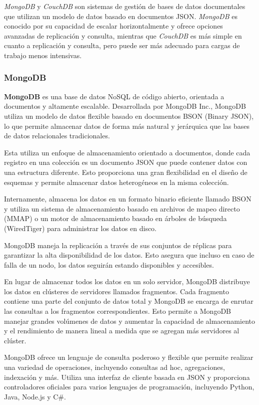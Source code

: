 \documentclass[pdflatex,sn-mathphys-num]{sn-jnl}
\theoremstyle{thmstyleone}%
\theoremstyle{thmstyletwo}%
\theoremstyle{thmstylethree}%
\begin{document}
\textit{MongoDB} y \textit{CouchDB} son sistemas de gestión de bases de datos documentales que utilizan un modelo de datos basado en documentos JSON. \textit{MongoDB} es conocido por su capacidad de escalar horizontalmente y ofrece opciones avanzadas de replicación y consulta, mientras que \textit{CouchDB} es más simple en cuanto a replicación y consulta, pero puede ser más adecuado para cargas de trabajo menos intensivas.

\subsubsection{MongoDB}\label{sec431}

\textbf{MongoDB}\cite{mongodb} es una base de datos NoSQL de código abierto, orientada a documentos y altamente escalable. Desarrollada por MongoDB Inc., MongoDB utiliza un modelo de datos flexible basado en documentos BSON (Binary JSON), lo que permite almacenar datos de forma más natural y jerárquica que las bases de datos relacionales tradicionales.

Esta utiliza un enfoque de almacenamiento orientado a documentos, donde cada registro en una colección es un documento JSON que puede contener datos con una estructura diferente. Esto proporciona una gran flexibilidad en el diseño de esquemas y permite almacenar datos heterogéneos en la misma colección.

Internamente, almacena los datos en un formato binario eficiente llamado BSON y utiliza un sistema de almacenamiento basado en archivos de mapeo directo (MMAP) o un motor de almacenamiento basado en árboles de búsqueda (WiredTiger) para administrar los datos en disco.

MongoDB maneja la replicación a través de sus conjuntos de réplicas para garantizar la alta disponibilidad de los datos. Esto asegura que incluso en caso de falla de un nodo, los datos seguirán estando disponibles y accesibles.

En lugar de almacenar todos los datos en un solo servidor, MongoDB distribuye los datos en clústeres de servidores llamados fragmentos. Cada fragmento contiene una parte del conjunto de datos total y MongoDB se encarga de enrutar las consultas a los fragmentos correspondientes. Esto permite a MongoDB manejar grandes volúmenes de datos y aumentar la capacidad de almacenamiento y el rendimiento de manera lineal a medida que se agregan más servidores al clúster.

MongoDB ofrece un lenguaje de consulta poderoso y flexible que permite realizar una variedad de operaciones, incluyendo consultas ad hoc, agregaciones, indexación y más. Utiliza una interfaz de cliente basada en JSON y proporciona controladores oficiales para varios lenguajes de programación, incluyendo Python, Java, Node.js y C\#.
\end{document}
